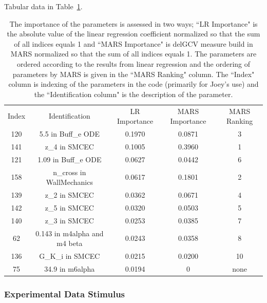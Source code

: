 \documentclass[12pt]{article}
\numberwithin{equation}{section}
\begin{document}
Tabular data in Table~\ref{qoi_AM_AMp_Min_rec}.

 
\begin{table}[h]
\centering
\begin{tabular}{ccccc}
Index & Identification & LR Importance & MARS Importance & MARS Ranking \\
120 & 5.5 in Buff\_e ODE & 0.1970 & 0.0871 & 3\\
141 & z\_4 in SMCEC & 0.1005 & 0.3960 & 1\\
121 & 1.09 in Buff\_e ODE & 0.0627 & 0.0442 & 6\\
158 & n\_cross in WallMechanics & 0.0617 & 0.1801 & 2\\
139 & z\_2 in SMCEC & 0.0362 & 0.0671 & 4\\
142 & z\_5 in SMCEC & 0.0320 & 0.0503 & 5\\
140 & z\_3 in SMCEC & 0.0253 & 0.0385 & 7\\
62 & 0.143 in m4alpha and m4 beta & 0.0243 & 0.0358 & 8\\
136 & G\_K\_i in SMCEC & 0.0215 & 0.0200 & 10\\
75 & 34.9 in m6alpha & 0.0194 & 0 & none\\
\end{tabular}
\caption{The importance of the parameters is assessed in two ways; ``LR Importance" is the absolute value of the linear regression coefficient normalized so that the sum of all indices equals 1 and ``MARS Importance" is delGCV measure build in MARS normalized so that the sum of all indices equals 1. The parameters are ordered according to the results from linear regression and the ordering of parameters by MARS is given in the ``MARS Ranking" column. The ``Index" column is indexing of the parameters in the code (primarily for Joey's use) and the ``Identification column" is the description of the parameter.}
\label{qoi_AM_AMp_Min_rec}
\end{table}

\newpage

\subsubsection{Experimental Data Stimulus}
\end{document}
